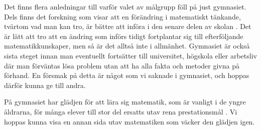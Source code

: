 \textcolor{lila}{
    Det finns flera anledningar till varför valet av målgrupp föll på just gymnasiet. Dels finns det forskning som visar att en förändring i matematiskt tänkande, tvärtom vad man kan tro, är bättre att införa i den senare delen av skolan \cite{TheElephant}. Det är lätt att tro att en ändring som införs tidigt fortplantar sig till efterföljande matematikkunskaper, men så är det alltså inte i allmänhet. Gymnasiet är också sista steget innan man eventuellt fortsätter till universitet, högskola eller arbetsliv där man förväntas lösa problem utan att ha alla fakta och metoder givna på förhand. En försmak på detta är något som vi saknade i gymnasiet, och hoppas därför kunna ge till andra.}
    
\textcolor{lila}{        
    På gymnasiet har glädjen för att lära sig matematik, som är vanligt i de yngre åldrarna, för många elever till stor del ersatts utav rena prestationsmål \cite{Skolverket03}. Vi hoppas kunna visa en annan sida utav matematiken som väcker den glädjen igen.}
   
        

